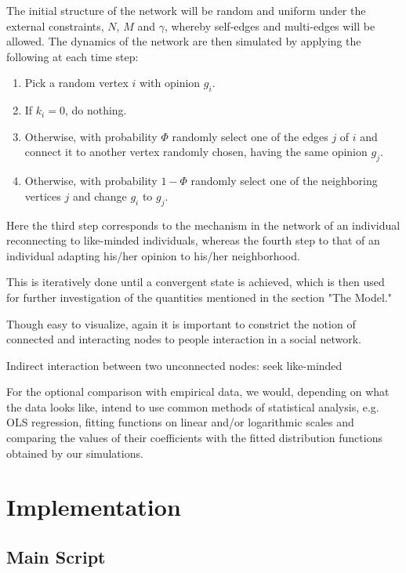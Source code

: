 \documentclass[11pt]{article}
\begin{document}
The initial structure of the network will be random and uniform under the external constraints, $N$, $M$ and $\gamma$, whereby self-edges and multi-edges will be allowed. The dynamics of the network are then simulated by applying the following at each time step:

\begin{enumerate}
\item Pick a random vertex $i$ with opinion $g_i$. 
\item If $k_i=0$, do nothing. 
\item Otherwise, with probability $\Phi$ randomly select one of the edges $j$ of $i$ and connect it to another vertex randomly chosen, having the same opinion $g_j$.
\item Otherwise, with probability $1-\Phi$ randomly select one of the neighboring vertices $j$ and change $g_i$ to $g_j$.
\end{enumerate}


Here the third step corresponds to the mechanism in the network of an individual reconnecting to like-minded individuals, whereas the fourth step to that of an individual adapting his/her opinion to his/her neighborhood. 

This is iteratively done until a convergent state is achieved, which is then used for further investigation of the quantities mentioned in the section "The  Model."

Though easy to visualize, again it is important to constrict the notion of connected and interacting nodes to people interaction in a social network.

Indirect interaction between two unconnected nodes: seek like-minded

For the optional comparison with empirical data, we would, depending on what the data looks like, intend to use common methods of statistical analysis, e.g. OLS regression, fitting functions on linear and/or logarithmic scales and comparing the values of their coefficients with the fitted distribution functions obtained by our simulations.



\section{Implementation}

\subsection{Main Script}
\end{document}
